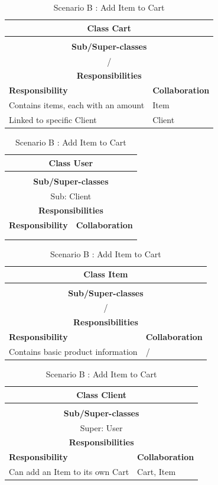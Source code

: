 \documentclass[•]{article}
\begin{document}
\begin{table}
\begin{tabular}{|l||l|}
\hline
\multicolumn{2}{|c|}{ Class \textbf{Cart} }\\ \hline
\multicolumn{2}{|c|}{}\\ \hline
\multicolumn{2}{|c|}{ \textbf{Sub/Super-classes} }\\ \hline
\multicolumn{2}{|c|}{/} \\ \hline
\multicolumn{2}{|c|}{ \textbf{Responsibilities}}\\ \hline
\textbf{Responsibility} & \textbf{Collaboration} \\ \hline
Contains items, each with an amount & Item \\ \hline
Linked to specific Client & Client \\ \hline
\end{tabular}
\begin{tabular}{|l||l|}
\hline
\multicolumn{2}{|c|}{ Class \textbf{User} }\\ \hline
\multicolumn{2}{|c|}{}\\ \hline
\multicolumn{2}{|c|}{ \textbf{Sub/Super-classes} }\\ \hline
\multicolumn{2}{|c|}{Sub: Client} \\ \hline
\multicolumn{2}{|c|}{ \textbf{Responsibilities}}\\ \hline
\textbf{Responsibility} & \textbf{Collaboration} \\ \hline
 & \\
 &  \\ 
 \hline
\end{tabular}

\begin{tabular}{|l||l|}
\hline
\multicolumn{2}{|c|}{ Class \textbf{Item} }\\ \hline
\multicolumn{2}{|c|}{}\\ \hline
\multicolumn{2}{|c|}{ \textbf{Sub/Super-classes} }\\ \hline
\multicolumn{2}{|c|}{/} \\ \hline
\multicolumn{2}{|c|}{ \textbf{Responsibilities}}\\ \hline
\textbf{Responsibility} & \textbf{Collaboration} \\ \hline
Contains basic product information & / \\ \hline
\end{tabular}
\begin{tabular}{|l||l|}
\hline
\multicolumn{2}{|c|}{ Class \textbf{Client} }\\ \hline
\multicolumn{2}{|c|}{}\\ \hline
\multicolumn{2}{|c|}{ \textbf{Sub/Super-classes} }\\ \hline
\multicolumn{2}{|c|}{Super: User} \\ \hline
\multicolumn{2}{|c|}{ \textbf{Responsibilities}}\\ \hline
\textbf{Responsibility} & \textbf{Collaboration} \\ \hline
Can add an Item to its own Cart & Cart, Item  \\ \hline
\end{tabular}
\caption{Scenario B : Add Item to Cart}
\label{scenarioB}
\end{table}
\end{document}
